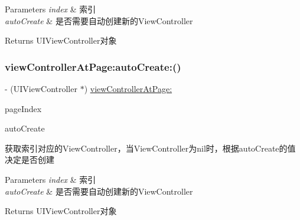 \begin{DoxyParams}{Parameters}
{\em index} & 索引 \\
\hline
{\em auto\+Create} & 是否需要自动创建新的\+View\+Controller\\
\hline
\end{DoxyParams}
\begin{DoxyReturn}{Returns}
U\+I\+View\+Controller对象 
\end{DoxyReturn}
\mbox{\label{interface_v_t_content_view_a688090ca86d8df39124c8720eb72e496}} 
\subsubsection{\texorpdfstring{view\+Controller\+At\+Page\+:auto\+Create\+:()}{viewControllerAtPage:autoCreate:()}\hspace{0.1cm}{\footnotesize\ttfamily [2/3]}}
{\footnotesize\ttfamily -\/ (U\+I\+View\+Controller $\ast$) \mbox{\hyperlink{interface_v_t_content_view_ae81362c80f8f700ad3c69d814da4ca9b}{view\+Controller\+At\+Page\+:}} \begin{DoxyParamCaption}\item[{(N\+S\+U\+Integer)}]{page\+Index }\item[{autoCreate:(B\+O\+OL)}]{auto\+Create }\end{DoxyParamCaption}}

获取索引对应的\+View\+Controller，当\+View\+Controller为nil时，根据auto\+Create的值决定是否创建


\begin{DoxyParams}{Parameters}
{\em index} & 索引 \\
\hline
{\em auto\+Create} & 是否需要自动创建新的\+View\+Controller\\
\hline
\end{DoxyParams}
\begin{DoxyReturn}{Returns}
U\+I\+View\+Controller对象 
\end{DoxyReturn}
\mbox{\label{interface_v_t_content_view_a688090ca86d8df39124c8720eb72e496}} 
